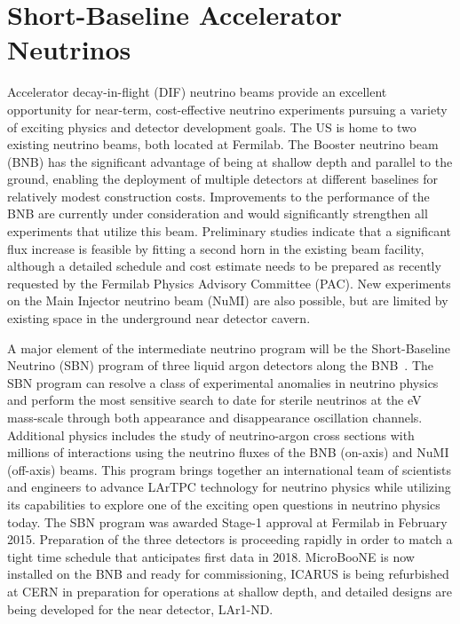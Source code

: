 \section{Short-Baseline Accelerator Neutrinos}
\label{sec:AcceleratorSB}

Accelerator decay-in-flight (DIF) neutrino beams provide an excellent
opportunity for near-term, cost-effective neutrino experiments
pursuing a variety of exciting physics and detector development goals.
The US is home to two existing neutrino beams, both located at
Fermilab.  The Booster neutrino beam (BNB) has the significant
advantage of being at shallow depth and parallel to the ground,
enabling the deployment of multiple detectors at different baselines
for relatively modest construction costs.  Improvements to the
performance of the BNB are currently under consideration and would
significantly strengthen all experiments that utilize this beam.
Preliminary studies indicate that a significant flux increase is
feasible by fitting a second horn in the existing beam facility,
although a detailed schedule and cost estimate needs to be prepared as
recently requested by the Fermilab Physics Advisory Committee
(PAC). New experiments on the Main Injector neutrino beam (NuMI) are
also possible, but are limited by existing space in the underground
near detector cavern.

A major element of the intermediate neutrino program will be the
Short-Baseline Neutrino (SBN) program of three liquid argon detectors
along the BNB~\cite{SBNProposal}.  The SBN program can resolve a class
of experimental anomalies in neutrino physics and perform the most
sensitive search to date for sterile neutrinos at the eV mass-scale
through both appearance and disappearance oscillation
channels. Additional physics includes the study of neutrino-argon
cross sections with millions of interactions using the neutrino fluxes
of the BNB (on-axis) and NuMI (off-axis) beams.  This program brings
together an international team of scientists and engineers to advance
LArTPC technology for neutrino physics while utilizing its
capabilities to explore one of the exciting open questions in neutrino
physics today.  The SBN program was awarded Stage-1 approval at
Fermilab in February 2015.  Preparation of the three detectors is
proceeding rapidly in order to match a tight time schedule that
anticipates first data in 2018.  MicroBooNE is now installed on the
BNB and ready for commissioning, ICARUS is being refurbished at CERN
in preparation for operations at shallow depth, and detailed designs
are being developed for the near detector, LAr1-ND.

